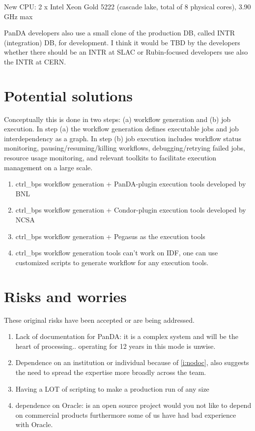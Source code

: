 New CPU: 2 x Intel Xeon Gold 5222 (cascade lake, total of 8 physical cores), 3.90 GHz max

PanDA developers also use a small clone of the production DB, called INTR (integration) DB, for development. I think it would be TBD by the developers whether there should be an INTR at SLAC or Rubin-focused developers use also the INTR at CERN.


\section {Potential solutions} \label{sec:potential}

Conceptually this is done in two steps: (a) workflow generation and (b) job execution.
In step (a) the workflow generation defines executable jobs and job interdependency as a graph.
In step (b) job execution includes workflow status monitoring, pausing/resuming/killing workflows, debugging/retrying failed jobs, resource usage monitoring, and relevant toolkits to facilitate execution management on a large scale.
\begin{enumerate}
\item  ctrl\_bps workflow generation + PanDA-plugin execution tools developed by BNL
\item ctrl\_bps workflow generation + Condor-plugin execution tools developed by NCSA
\item ctrl\_bps workflow generation + Pegasus as the execution tools
\item ctrl\_bps workflow generation tools can't work on IDF, one can use customized scripts to generate workflow for any execution tools.
\end{enumerate}



\section {Risks and worries}
These original risks have been accepted or are being addressed.
\begin{enumerate}
\item Lack of documentation for PanDA: it is a complex system and will
  be the heart of processing.. operating for 12 years in this mode is unwise.\label{i:nodoc}
\item Dependence on an institution or individual because of
  \ref{i:nodoc}, also suggests the need to spread the expertise more
  broadly across the team.
\item Having a LOT of scripting to make a production run of any size
\item dependence on Oracle: is an open source project would you not like to depend on commercial products furthermore some of us have had bad experience with Oracle.
\end{enumerate}
